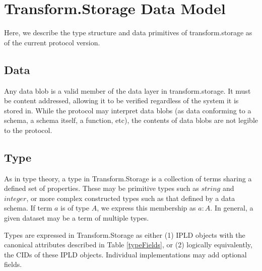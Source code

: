 \documentclass[9pt, oneside]{article}   	%
\begin{document}
\section{Transform.Storage Data Model}\label{transformtypes}

Here, we describe the type structure and data primitives of transform.storage as of the current protocol version.

\subsection{Data}\label{data}

Any data blob is a valid member of the data layer in transform.storage. It must be content addressed, allowing it to be verified regardless of the system it is stored in. While the protocol may interpret data blobs (as data conforming to a schema, a schema itself, a function, etc), the contents of data blobs are not legible to the protocol.

\subsection{Type}\label{type}

As in type theory, a type in Transform.Storage is a collection of terms sharing a defined set of properties. These may be primitive types such as $string$ and $integer$, or more complex constructed types such as that defined by a data schema. If term $a$ is of type $A$, we express this membership as $a:A$. In general, a given dataset may be a term of multiple types.

Types are expressed in Transform.Storage as either (1) IPLD objects with the canonical attributes described in Table \ref{typeFields}, or (2) logically equivalently, the CIDs of these IPLD objects. Individual implementations may add optional fields.
\end{document}
